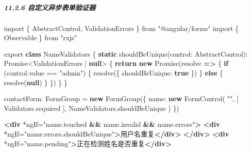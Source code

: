 \documentclass[
]{article}
\newenvironment{Shaded}{}{}
\newcommand{\AttributeTok}[1]{\textcolor[rgb]{0.49,0.56,0.16}{#1}}
\newcommand{\BuiltInTok}[1]{#1}
\newcommand{\ControlFlowTok}[1]{\textcolor[rgb]{0.00,0.44,0.13}{\textbf{#1}}}
\newcommand{\DataTypeTok}[1]{\textcolor[rgb]{0.56,0.13,0.00}{#1}}
\newcommand{\ErrorTok}[1]{\textcolor[rgb]{1.00,0.00,0.00}{\textbf{#1}}}
\newcommand{\FunctionTok}[1]{\textcolor[rgb]{0.02,0.16,0.49}{#1}}
\newcommand{\ImportTok}[1]{#1}
\newcommand{\KeywordTok}[1]{\textcolor[rgb]{0.00,0.44,0.13}{\textbf{#1}}}
\newcommand{\NormalTok}[1]{#1}
\newcommand{\OperatorTok}[1]{\textcolor[rgb]{0.40,0.40,0.40}{#1}}
\newcommand{\OtherTok}[1]{\textcolor[rgb]{0.00,0.44,0.13}{#1}}
\newcommand{\StringTok}[1]{\textcolor[rgb]{0.25,0.44,0.63}{#1}}
\begin{document}
\hypertarget{1126-ux81eaux5b9aux4e49ux5f02ux6b65ux8868ux5355ux9a8cux8bc1ux5668}{%
\subparagraph{11.2.6
自定义异步表单验证器}\label{1126-ux81eaux5b9aux4e49ux5f02ux6b65ux8868ux5355ux9a8cux8bc1ux5668}}

\begin{Shaded}
\begin{Highlighting}[]
\ImportTok{import}\NormalTok{ \{ AbstractControl}\OperatorTok{,}\NormalTok{ ValidationErrors \} }\ImportTok{from} \StringTok{"@angular/forms"}
\ImportTok{import}\NormalTok{ \{ Observable \} }\ImportTok{from} \StringTok{"rxjs"}

\ImportTok{export} \KeywordTok{class}\NormalTok{ NameValidators \{}
  \KeywordTok{static} \FunctionTok{shouldBeUnique}\NormalTok{(}\DataTypeTok{control}\OperatorTok{:}\NormalTok{ AbstractControl)}\OperatorTok{:} \BuiltInTok{Promise}\OperatorTok{\textless{}}\NormalTok{ValidationErrors }\OperatorTok{|} \KeywordTok{null}\OperatorTok{\textgreater{}}\NormalTok{ \{}
    \ControlFlowTok{return} \KeywordTok{new} \BuiltInTok{Promise}\NormalTok{(resolve }\KeywordTok{=\textgreater{}}\NormalTok{ \{}
      \ControlFlowTok{if}\NormalTok{ (control}\OperatorTok{.}\AttributeTok{value} \OperatorTok{==} \StringTok{"admin"}\NormalTok{) \{}
         \FunctionTok{resolve}\NormalTok{(\{ }\DataTypeTok{shouldBeUnique}\OperatorTok{:} \KeywordTok{true}\NormalTok{ \})}
\NormalTok{       \} }\ControlFlowTok{else}\NormalTok{ \{}
         \FunctionTok{resolve}\NormalTok{(}\KeywordTok{null}\NormalTok{)}
\NormalTok{       \}}
\NormalTok{    \})}
\NormalTok{  \}}
\NormalTok{\}}
\end{Highlighting}
\end{Shaded}

\begin{Shaded}
\begin{Highlighting}[]
\NormalTok{contactForm}\OperatorTok{:}\NormalTok{ FormGroup }\OperatorTok{=} \KeywordTok{new} \FunctionTok{FormGroup}\NormalTok{(\{}
    \DataTypeTok{name}\OperatorTok{:} \KeywordTok{new} \FunctionTok{FormControl}\NormalTok{(}
      \StringTok{""}\OperatorTok{,}
\NormalTok{      [}
\NormalTok{        Validators}\OperatorTok{.}\AttributeTok{required}
\NormalTok{      ]}\OperatorTok{,}
\NormalTok{      NameValidators}\OperatorTok{.}\AttributeTok{shouldBeUnique}
\NormalTok{    )}
\NormalTok{  \})}
\end{Highlighting}
\end{Shaded}

\begin{Shaded}
\begin{Highlighting}[]
\KeywordTok{\textless{}div}\OtherTok{ *ngIf=}\StringTok{"name.touched }\ErrorTok{\&\&}\StringTok{ name.invalid }\ErrorTok{\&\&}\StringTok{ name.errors"}\KeywordTok{\textgreater{}}
  \KeywordTok{\textless{}div}\OtherTok{ *ngIf=}\StringTok{"name.errors.shouldBeUnique"}\KeywordTok{\textgreater{}}\NormalTok{用户名重复}\KeywordTok{\textless{}/div\textgreater{}}
\KeywordTok{\textless{}/div\textgreater{}}
\KeywordTok{\textless{}div}\OtherTok{ *ngIf=}\StringTok{"name.pending"}\KeywordTok{\textgreater{}}\NormalTok{正在检测姓名是否重复}\KeywordTok{\textless{}/div\textgreater{}}
\end{Highlighting}
\end{Shaded}
\end{document}
